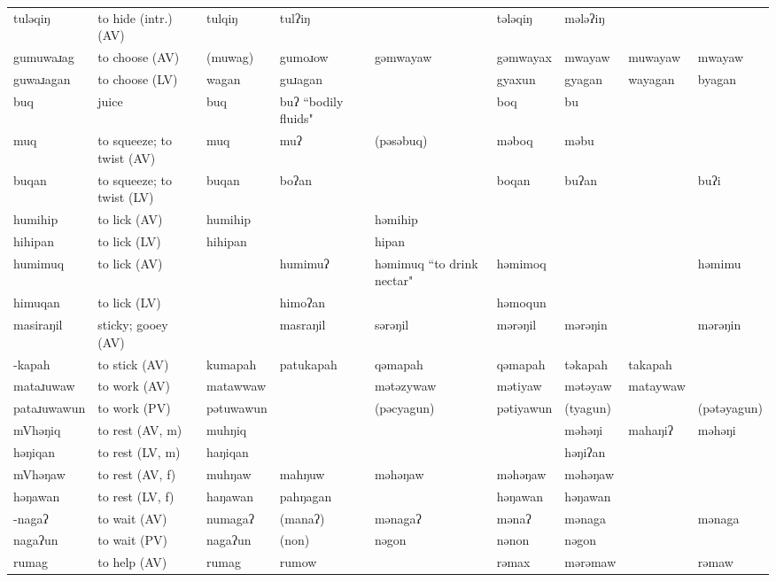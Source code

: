 \begin{landscape}
\begin{longtable}{*{9}{>{\raggedright\arraybackslash}p{}}}
\text{*}tuləqiŋ & to hide (intr.) (AV) & tulqiŋ & tulʔiŋ &  & tələqiŋ & mələʔiŋ &  & \\
\text{*}gumuwaɹag & to choose (AV) & (muwag) & gumoɹow & gəmwayaw & gəmwayax & mwayaw & muwayaw & mwayaw\\
\text{*}guwaɹagan & to choose (LV) & wagan & guɹagan &  & gyaxun & gyagan & wayagan & byagan\\
\text{*}buq & juice & buq & buʔ ``bodily fluids" &  & boq & bu &  & \\
\text{*}muq & to squeeze; to twist (AV) & muq & muʔ & (pəsəbuq) & məboq & məbu &  & \\
\text{*}buqan & to squeeze; to twist (LV) & buqan & boʔan &  & boqan & buʔan &  & buʔi\\
\text{*}humihip & to lick (AV) & humihip &  & həmihip &  &  &  & \\
\text{*}hihipan & to lick (LV) & hihipan &  & hipan &  &  &  & \\
\text{*}humimuq & to lick (AV) &  & humimuʔ & həmimuq ``to drink nectar" & həmimoq &  &  & həmimu\\
\text{*}himuqan & to lick (LV) &  & himoʔan &  & həmoqun &  &  & \\
\text{*}masiraŋil & sticky; gooey (AV) &  & masraŋil & sərəŋil & mərəŋil & mərəŋin &  & mərəŋin\\
\text{*}-kapah & to stick (AV) & kumapah & patukapah & qəmapah & qəmapah & təkapah & takapah & \\
\text{*}mataɹuwaw & to work (AV) & matawwaw &  & mətəzywaw & mətiyaw & mətəyaw & mataywaw & \\
\text{*}pataɹuwawun & to work (PV) & pətuwawun &  & (pəcyagun) & pətiyawun & (tyagun) &  & (pətəyagun)\\
\text{*}mVhəŋiq & to rest (AV, m) & muhŋiq &  &  &  & məhəŋi & mahaŋiʔ & məhəŋi\\
\text{*}həŋiqan & to rest (LV, m) & haŋiqan &  &  &  & həŋiʔan &  & \\
\text{*}mVhəŋaw & to rest (AV, f) & muhŋaw & mahŋuw & məhəŋaw & məhəŋaw & məhəŋaw &  & \\
\text{*}həŋawan & to rest (LV, f) & haŋawan & pahŋagan &  & həŋawan & həŋawan &  & \\
\text{*}-nagaʔ & to wait (AV) & numagaʔ & (manaʔ) & mənagaʔ & mənaʔ & mənaga &  & mənaga\\
\text{*}nagaʔun & to wait (PV) & nagaʔun & (non) & nəgon & nənon & nəgon &  & \\
\text{*}rumag & to help (AV) & rumag & rumow &  & rəmax & mərəmaw &  & rəmaw\\

\end{longtable}
\end{landscape}
